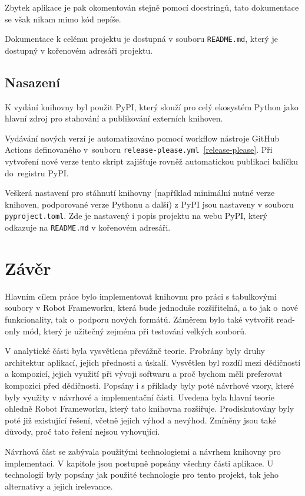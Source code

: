 Zbytek aplikace je pak okomentován stejně pomocí docstringů, tato dokumentace se však nikam mimo kód nepíše.

Dokumentace k celému projektu je dostupná v souboru \texttt{README.md}, který je dostupný v kořenovém adresáři projektu.

\section{Nasazení}

K vydání knihovny byl použit PyPI, který slouží pro celý ekosystém Python jako hlavní zdroj pro stahování a publikování externích knihoven.

Vydávání nových verzí je automatizováno pomocí workflow nástroje GitHub Actions definovaného v~souboru \texttt{release-please.yml}~\ref{release-please}. Při vytvoření nové verze tento skript zajišťuje rovněž automatickou publikaci balíčku do~registru PyPI.

Veškerá nastavení pro stáhnutí knihovny (například minimální nutné verze knihoven, podporované verze Pythonu a další) z PyPI jsou nastaveny v souboru \texttt{pyproject.toml}. Zde je nastavený i popis projektu na webu PyPI, který odkazuje na \texttt{README.md} v kořenovém adresáři.

\chapter{Závěr}

Hlavním cílem práce bylo implementovat knihovnu pro práci s tabulkovými soubory v Robot Frameworku, která bude jednoduše rozšiřitelná, a to jak o~nové funkcionality, tak o~podporu nových formátů. Záměrem bylo také vytvořit read-only mód, který je užitečný zejména při testování velkých souborů.

V analytické části byla vysvětlena převážně teorie. Probrány byly druhy architektur aplikací, jejich přednosti a úskalí. Vysvětlen byl rozdíl mezi dědičností a kompozicí, jejich využití při vývoji softwaru a proč bychom měli preferovat kompozici před dědičnosti. Popsány i s příklady byly poté návrhové vzory, které byly využity v návrhové a implementační části. Uvedena byla hlavní teorie ohledně Robot Frameworku, který tato knihovna rozšiřuje. Prodiskutovány byly poté již existující řešení, včetně jejich výhod a nevýhod. Zmíněny jsou také důvody, proč tato řešení nejsou vyhovující.

Návrhová část se zabývala použitými technologiemi a návrhem knihovny pro implementaci. V kapitole jsou postupně popsány všechny části aplikace. U technologií byly popsány jak použité technologie pro tento projekt, tak jeho alternativy a jejich irelevance.


